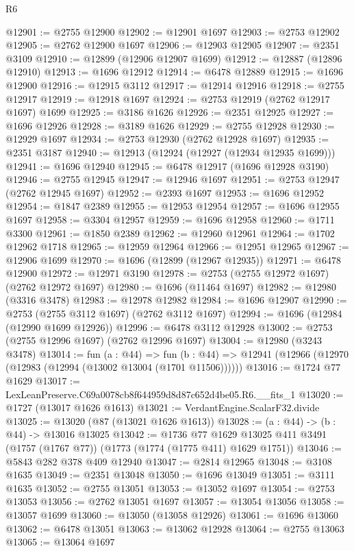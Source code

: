 \begin{lexlean}{R6}
\begin{coremodule}
@12901 := @2755 @12900
@12902 := @12901 @1697
@12903 := @2753 @12902
@12905 := @2762 @12900 @1697
@12906 := @12903 @12905
@12907 := @2351 @3109
@12910 := @12899 (@12906 @12907 @1699)
@12912 := @12887 (@12896 @12910)
@12913 := @1696 @12912
@12914 := @6478 @12889
@12915 := @1696 @12900
@12916 := @12915 @3112
@12917 := @12914 @12916
@12918 := @2755 @12917
@12919 := @12918 @1697
@12924 := @2753 @12919 (@2762 @12917 @1697) @1699
@12925 := @3186 @1626
@12926 := @2351 @12925
@12927 := @1696 @12926
@12928 := @3189 @1626
@12929 := @2755 @12928
@12930 := @12929 @1697
@12934 := @2753 @12930 (@2762 @12928 @1697)
@12935 := @2351 @3187
@12940 := @12913 (@12924 (@12927 (@12934 @12935 @1699)))
@12941 := @1696 @12940
@12945 := @6478 @12917 (@1696 @12928 @3190)
@12946 := @2755 @12945
@12947 := @12946 @1697
@12951 := @2753 @12947 (@2762 @12945 @1697)
@12952 := @2393 @1697
@12953 := @1696 @12952
@12954 := @1847 @2389
@12955 := @12953 @12954
@12957 := @1696 @12955 @1697
@12958 := @3304 @12957
@12959 := @1696 @12958
@12960 := @1711 @3300
@12961 := @1850 @2389
@12962 := @12960 @12961
@12964 := @1702 @12962 @1718
@12965 := @12959 @12964
@12966 := @12951 @12965
@12967 := @12906 @1699
@12970 := @1696 (@12899 (@12967 @12935))
@12971 := @6478 @12900
@12972 := @12971 @3190
@12978 := @2753 (@2755 @12972 @1697) (@2762 @12972 @1697)
@12980 := @1696 (@11464 @1697)
@12982 := @12980 (@3316 @3478)
@12983 := @12978 @12982
@12984 := @1696 @12907
@12990 := @2753 (@2755 @3112 @1697) (@2762 @3112 @1697)
@12994 := @1696 (@12984 (@12990 @1699 @12926))
@12996 := @6478 @3112 @12928
@13002 := @2753 (@2755 @12996 @1697) (@2762 @12996 @1697)
@13004 := @12980 (@3243 @3478)
@13014 := fun (a : @44) =>
  fun (b : @44) => @12941 (@12966 (@12970 (@12983 (@12994 (@13002 @13004 (@1701 @11506))))))
@13016 := @1724 @77 @1629
@13017 := LexLeanPreserve.C69a0078cb8f644959d8d87c652d4be05.R6.__fits_1
@13020 := @1727 (@13017 @1626 @1613)
@13021 := VerdantEngine.ScalarF32.divide
@13025 := @13020 (@87 (@13021 @1626 @1613))
@13028 := (a : @44) -> (b : @44) -> @13016 @13025
@13042 := @1736
    @77
    @1629
    @13025
    @411
    @3491
    (@1757 (@1767 @77))
    (@1773 (@1774 (@1775 @411) @1629 @1751))
@13046 := @5843 @282 @378 @409 @12940
@13047 := @2814 @12965
@13048 := @3108 @1635
@13049 := @2351 @13048
@13050 := @1696 @13049
@13051 := @3111 @1635
@13052 := @2755 @13051
@13053 := @13052 @1697
@13054 := @2753 @13053
@13056 := @2762 @13051 @1697
@13057 := @13054 @13056
@13058 := @13057 @1699
@13060 := @13050 (@13058 @12926)
@13061 := @1696 @13060
@13062 := @6478 @13051
@13063 := @13062 @12928
@13064 := @2755 @13063
@13065 := @13064 @1697

\end{coremodule}
\end{lexlean}
